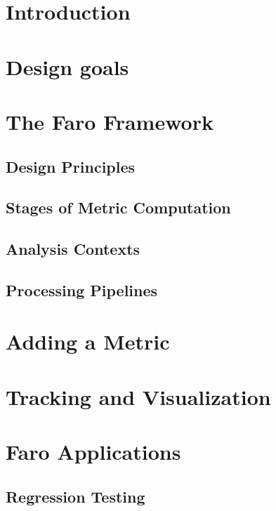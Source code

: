 \section{Introduction} \label{sec:intro}


\section{Design goals} \label{sec:design}


\section{The Faro Framework} \label{sec:faro}


\subsection{Design Principles} \label{ssec:principles}


\subsection{Stages of Metric Computation} \label{ssec:stages}


\subsection{Analysis Contexts} \label{ssec:contexts}


\subsection{Processing Pipelines} \label{ssec:pipelines}


\section{Adding a  Metric} \label{sec:add}


\section{Tracking and Visualization} \label{sec:tracking}


\section{Faro Applications} \label{sec:applications}

\subsection{Regression Testing} \label{ssec:regression}


